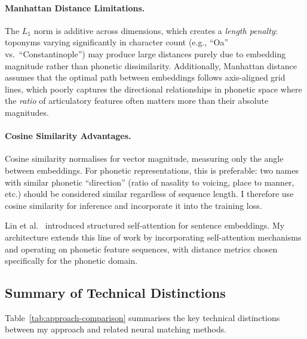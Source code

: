 \documentclass[11pt,a4paper]{article}
\begin{document}
\paragraph{Manhattan Distance Limitations.} The $L_1$ norm is additive across dimensions, which creates a \emph{length penalty}: toponyms varying significantly in character count (e.g., ``Oa'' vs.\ ``Constantinople'') may produce large distances purely due to embedding magnitude rather than phonetic dissimilarity. Additionally, Manhattan distance assumes that the optimal path between embeddings follows axis-aligned grid lines, which poorly captures the directional relationships in phonetic space where the \emph{ratio} of articulatory features often matters more than their absolute magnitudes.

\paragraph{Cosine Similarity Advantages.} Cosine similarity normalises for vector magnitude, measuring only the angle between embeddings. For phonetic representations, this is preferable: two names with similar phonetic ``direction'' (ratio of nasality to voicing, place to manner, etc.) should be considered similar regardless of sequence length. I therefore use cosine similarity for inference and incorporate it into the training loss.

Lin et al.~\citep{lin2017structured} introduced structured self-attention for sentence embeddings. My architecture extends this line of work by incorporating self-attention mechanisms and operating on phonetic feature sequences, with distance metrics chosen specifically for the phonetic domain.

\subsection{Summary of Technical Distinctions}

Table~\ref{tab:approach-comparison} summarises the key technical distinctions between my approach and related neural matching methods.
\end{document}
